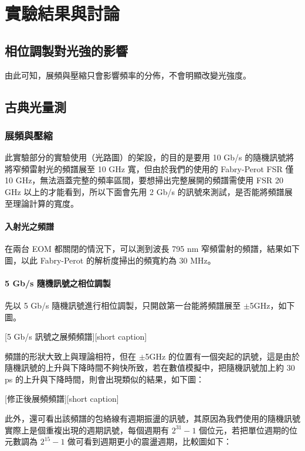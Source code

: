 \documentclass[class=NCU_thesis, crop=false]{standalone}
\begin{document}
\chapter{實驗結果與討論}

\section{相位調製對光強的影響}
由此可知，展頻與壓縮只會影響頻率的分佈，不會明顯改變光強度。

\section{古典光量測}
\subsection{展頻與壓縮}
此實驗部分的實驗使用（光路圖）的架設，的目的是要用 10 Gb/s 的隨機訊號將將窄頻雷射光的頻譜展至 10 GHz 寬，但由於我們的使用的 Fabry-Perot FSR 僅 10 GHz，無法涵蓋完整的頻率區間，要想掃出完整展開的頻譜需使用 FSR 20 GHz 以上的才能看到，所以下面會先用 2 Gb/s 的訊號來測試，是否能將頻譜展至理論計算的寬度。

\subsubsection{入射光之頻譜}
在兩台 EOM 都關閉的情況下，可以測到波長 795 nm 窄頻雷射的頻譜，結果如下圖，以此 Fabry-Perot 的解析度掃出的頻寬約為 30 MHz。

\subsubsection{5 Gb/s 隨機訊號之相位調製}
先以 5 Gb/s 隨機訊號進行相位調製，只開啟第一台能將頻譜展至 $\pm$5GHz，如下圖。

[5 Gb/s 訊號之展頻頻譜][short caption]

頻譜的形狀大致上與理論相符，但在 $\pm$5GHz 的位置有一個突起的訊號，這是由於隨機訊號的上升與下降時間不夠快所致，若在數值模擬中，把隨機訊號加上約 30 ps 的上升與下降時間，則會出現類似的結果，如下圖：

[修正後展頻頻譜][short caption]

此外，還可看出該頻譜的包絡線有週期振盪的訊號，其原因為我們使用的隨機訊號實際上是個重複出現的週期訊號，每個週期有 $2^{31}-1$ 個位元，若把單位週期的位元數調為 $2^{15}-1$ 做可看到週期更小的震盪週期，比較圖如下：
\end{document}
